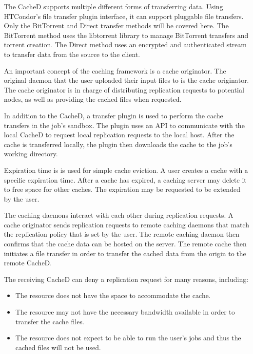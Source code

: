 \label{sec:cachedtransfermethods}
The CacheD supports multiple different forms of transferring data.  Using HTCondor's file transfer plugin interface, it can support pluggable file transfers.  Only the BitTorrent and Direct transfer methods will be covered here.  The BitTorrent method uses the libtorrent library to manage BitTorrent transfers and torrent creation.  The Direct method uses an encrypted and authenticated stream to transfer data from the source to the client.

An important concept of the caching framework is a cache originator.  The original daemon that the user uploaded their input files to is the cache originator.  The cache originator is in charge of distributing replication requests to potential nodes, as well as providing the cached files when requested.

In addition to the CacheD, a transfer plugin is used to perform the cache transfers in the job's sandbox.  The plugin uses an API to communicate with the local CacheD to request local replication requests to the local host.  After the cache is transferred locally, the plugin then downloads the cache to the job's working directory.

Expiration time is is used for simple cache eviction.  A user creates a cache with a specific expiration time.  After a cache has expired, a caching server may delete it to free space for other caches.  The expiration may be requested to be extended by the user.

The caching daemons interact with each other during replication requests.  A cache originator sends replication requests to remote caching daemons that match the replication policy that is set by the user.  The remote caching daemon then confirms that the cache data can be hosted on the server.  The remote cache then initiates a file transfer in order to transfer the cached data from the origin to the remote CacheD.

The receiving CacheD can deny a replication request for many reasons, including:
\begin{itemize}
	\item The resource does not have the space to accommodate the cache.
	\item The resource may not have the necessary bandwidth available in order to transfer the cache files.
	\item The resource does not expect to be able to run the user's jobs and thus the cached files will not be used.
\end{itemize}

